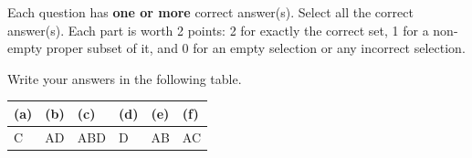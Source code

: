 
Each question has \textbf{one or more} correct answer(s). Select all the correct answer(s). Each part is worth 2 points: 2 for exactly the correct set, 1 for a non-empty proper subset of it, and 0 for an empty selection or any incorrect selection.

Write your answers in the following table.

\begin{table}[htbp]
	\centering
	\begin{tabular}{|p{1.6cm}|p{1.6cm}|p{1.6cm}|p{1.6cm}|p{1.6cm}|p{1.6cm}|}
		\hline
		(a) & (b) & (c) & (d) & (e) & (f) \\
		\hline
		C & AD & ABD & D & AB & AC \\
		\hline
	\end{tabular}
\end{table}

